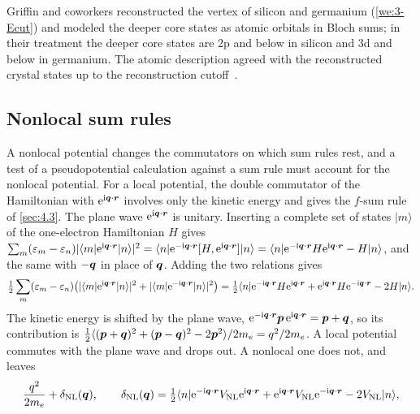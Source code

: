 Griffin and coworkers reconstructed the vertex of silicon and germanium (\cref{we:3-Ecut}) and modeled the deeper core states as atomic orbitals in Bloch sums; in their treatment the deeper core states are 2p and below in silicon and 3d and below in germanium. The atomic description agreed with the reconstructed crystal states up to the reconstruction cutoff~\cite[Sect.~2.2]{griffin2021extended}.

\subsection{Nonlocal sum rules}

A nonlocal potential changes the commutators on which sum rules rest, and a test of a pseudopotential calculation against a sum rule must account for the nonlocal potential. For a local potential, the double commutator of the Hamiltonian with $\mathrm{e}^{\mathrm{i}\bm{q}\cdot\bm{r}}$ involves only the kinetic energy and gives the $f$-sum rule of \cref{sec:4.3}. The plane wave $\mathrm{e}^{\mathrm{i}\bm{q}\cdot\bm{r}}$ is unitary. Inserting a complete set of states $|m\rangle$ of the one-electron Hamiltonian $H$ gives $\sum_m(\varepsilon_m - \varepsilon_n)|\langle m|\mathrm{e}^{\mathrm{i}\bm{q}\cdot\bm{r}}|n\rangle|^2 = \langle n|\mathrm{e}^{-\mathrm{i}\bm{q}\cdot\bm{r}}[H, \mathrm{e}^{\mathrm{i}\bm{q}\cdot\bm{r}}]|n\rangle = \langle n|\mathrm{e}^{-\mathrm{i}\bm{q}\cdot\bm{r}}H\mathrm{e}^{\mathrm{i}\bm{q}\cdot\bm{r}} - H|n\rangle$, and the same with $-\bm{q}$ in place of $\bm{q}$. Adding the two relations gives
\begin{equation}
  \tfrac12\sum_m(\varepsilon_m - \varepsilon_n)\bigl(|\langle m|\mathrm{e}^{\mathrm{i}\bm{q}\cdot\bm{r}}|n\rangle|^2 + |\langle m|\mathrm{e}^{-\mathrm{i}\bm{q}\cdot\bm{r}}|n\rangle|^2\bigr) = \tfrac12\langle n|\mathrm{e}^{-\mathrm{i}\bm{q}\cdot\bm{r}}H\mathrm{e}^{\mathrm{i}\bm{q}\cdot\bm{r}} + \mathrm{e}^{\mathrm{i}\bm{q}\cdot\bm{r}}H\mathrm{e}^{-\mathrm{i}\bm{q}\cdot\bm{r}} - 2H|n\rangle .
  \label{eq:E.2-dc}
\end{equation}
The kinetic energy is shifted by the plane wave, $\mathrm{e}^{-\mathrm{i}\bm{q}\cdot\bm{r}}\bm{p}\,\mathrm{e}^{\mathrm{i}\bm{q}\cdot\bm{r}} = \bm{p} + \bm{q}$, so its contribution is $\tfrac12\langle(\bm{p} + \bm{q})^2 + (\bm{p} - \bm{q})^2 - 2\bm{p}^2\rangle/2m_e = q^2/2m_e$. A local potential commutes with the plane wave and drops out. A nonlocal one does not, and leaves
\begin{equation}
  \frac{q^2}{2m_e} + \delta_{\mathrm{NL}}(\bm{q}), \qquad
  \delta_{\mathrm{NL}}(\bm{q}) = \tfrac12\langle n|\mathrm{e}^{-\mathrm{i}\bm{q}\cdot\bm{r}}V_{\mathrm{NL}}\mathrm{e}^{\mathrm{i}\bm{q}\cdot\bm{r}} + \mathrm{e}^{\mathrm{i}\bm{q}\cdot\bm{r}}V_{\mathrm{NL}}\mathrm{e}^{-\mathrm{i}\bm{q}\cdot\bm{r}} - 2V_{\mathrm{NL}}|n\rangle ,
  \label{eq:E.2-fsumNL}
\end{equation}
